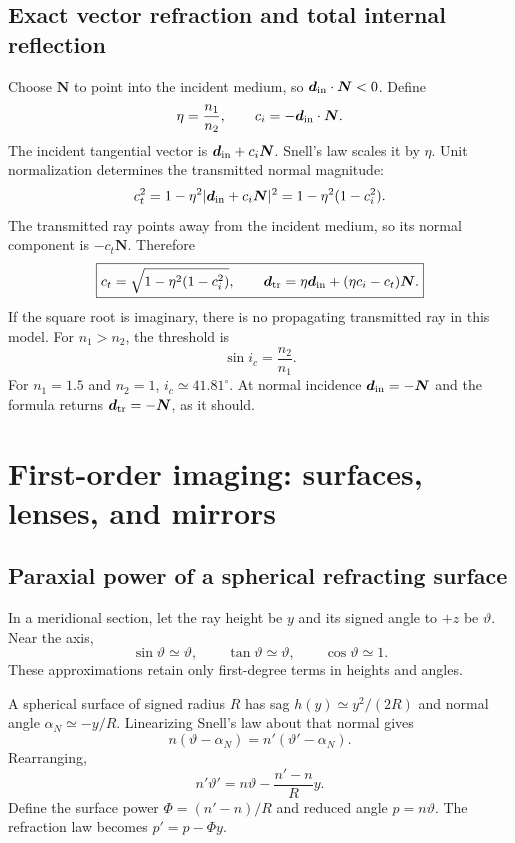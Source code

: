 \documentclass[11pt,a4paper]{article}
\numberwithin{equation}{section}
\newcommand{\vct}[1]{\bm{#1}}
\begin{document}
\subsection{Exact vector refraction and total internal reflection}
Choose $\vct N$ to point into the incident medium, so
$\vct d_{\rm in}\cdot\vct N<0$. Define
\[
 \eta=\frac{n_1}{n_2},\qquad c_i=-\vct d_{\rm in}\cdot\vct N.
\]
The incident tangential vector is $\vct d_{\rm in}+c_i\vct N$.
Snell's law scales it by $\eta$. Unit normalization determines the
transmitted normal magnitude:
\[
 c_t^2=1-\eta^2|\vct d_{\rm in}+c_i\vct N|^2
 =1-\eta^2(1-c_i^2).
\]
The transmitted ray points away from the incident medium, so its normal
component is $-c_t\vct N$. Therefore
\begin{equation}
 \boxed{
 c_t=\sqrt{1-\eta^2(1-c_i^2)},\qquad
 \vct d_{\rm tr}
 =\eta\vct d_{\rm in}+(\eta c_i-c_t)\vct N.
 }
\end{equation}
If the square root is imaginary, there is no propagating transmitted ray
in this model. For $n_1>n_2$, the threshold is
\[
 \sin i_c=\frac{n_2}{n_1}.
\]
For $n_1=1.5$ and $n_2=1$, $i_c\simeq41.81^\circ$.
At normal incidence $\vct d_{\rm in}=-\vct N$ and the formula returns
$\vct d_{\rm tr}=-\vct N$, as it should.

\section{First-order imaging: surfaces, lenses, and mirrors}
\subsection{Paraxial power of a spherical refracting surface}
In a meridional section, let the ray height be $y$ and its signed angle
to $+z$ be $\vartheta$. Near the axis,
\[
 \sin\vartheta\simeq\vartheta,\qquad
 \tan\vartheta\simeq\vartheta,\qquad \cos\vartheta\simeq1.
\]
These approximations retain only first-degree terms in heights and angles.

A spherical surface of signed radius $R$ has sag
$h(y)\simeq y^2/(2R)$ and normal angle $\alpha_N\simeq-y/R$.
Linearizing Snell's law about that normal gives
\[
 n(\vartheta-\alpha_N)=n'(\vartheta'-\alpha_N).
\]
Rearranging,
\begin{equation}
 \boxed{
 n'\vartheta'=n\vartheta-\frac{n'-n}{R}y.
 }
 \label{eq:surface-power}
\end{equation}
Define the surface power $\Phi=(n'-n)/R$ and reduced angle $p=n\vartheta$.
The refraction law becomes $p'=p-\Phi y$.
\end{document}
